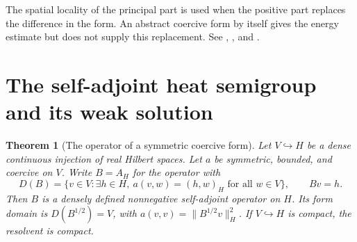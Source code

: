 \documentclass[11pt,oneside,openany]{book}
\theoremstyle{plain}
\newtheorem{theorem}{Theorem}[chapter]
\theoremstyle{definition}
\theoremstyle{remark}
\begin{document}
The spatial locality of the principal part is used when the
positive part replaces the difference in the form. An abstract
coercive form by itself gives the energy estimate but does not
supply this replacement. See \cite[\S\S 7.1.1--7.1.2]{Evans},
\cite[\S\S 10.1--10.2]{Brezis}, and
\cite[Chapter IX, \S\S 3--4]{Lieberman}.


\section{The self-adjoint heat semigroup and its weak solution}
\label{pde:H07}

\begin{theorem}[The operator of a symmetric coercive form]
\label{pde:heat-form-operator}
Let \(V\hookrightarrow H\) be a dense continuous injection of real
Hilbert spaces. Let \(a\) be symmetric, bounded, and coercive on \(V\).
Write \(B=A_H\) for the operator with
\[
 D(B)=\{v\in V:\exists h\in H,\ a(v,w)=(h,w)_H\text{ for all }w\in V\},
 \qquad Bv=h .
\]
Then \(B\) is a densely defined nonnegative self-adjoint operator on
\(H\). Its form domain is \(D(B^{1/2})=V\), with
\(a(v,v)=\|B^{1/2}v\|_H^2\).
If \(V\hookrightarrow H\) is compact, the resolvent is compact.
\end{theorem}
\end{document}
